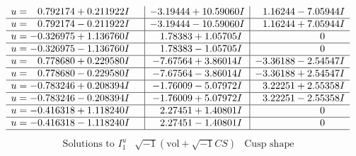 \documentclass[1p]{elsarticle_modified}
\theoremstyle{definition}
\newcommand{\I}{\sqrt{-1}}
\begin{document}
$$\begin{array}{c|c|c}
\begin{aligned}
u &= \phantom{-}0.792174 + 0.211922 I\end{aligned}
 & -3.19444 + 10.59060 I & \phantom{-}1.16244 - 7.05944 I \\ \hline\begin{aligned}
u &= \phantom{-}0.792174 - 0.211922 I\end{aligned}
 & -3.19444 - 10.59060 I & \phantom{-}1.16244 + 7.05944 I \\ \hline\begin{aligned}
u &= -0.326975 + 1.136760 I\end{aligned}
 & \phantom{-}1.78383 + 1.05705 I & \phantom{-0.000000 } 0 \\ \hline\begin{aligned}
u &= -0.326975 - 1.136760 I\end{aligned}
 & \phantom{-}1.78383 - 1.05705 I & \phantom{-0.000000 } 0 \\ \hline\begin{aligned}
u &= \phantom{-}0.778680 + 0.229580 I\end{aligned}
 & -7.67564 + 3.86014 I & -3.36188 - 2.54547 I \\ \hline\begin{aligned}
u &= \phantom{-}0.778680 - 0.229580 I\end{aligned}
 & -7.67564 - 3.86014 I & -3.36188 + 2.54547 I \\ \hline\begin{aligned}
u &= -0.783246 + 0.208394 I\end{aligned}
 & -1.76009 - 5.07972 I & \phantom{-}3.22251 + 2.55358 I \\ \hline\begin{aligned}
u &= -0.783246 - 0.208394 I\end{aligned}
 & -1.76009 + 5.07972 I & \phantom{-}3.22251 - 2.55358 I \\ \hline\begin{aligned}
u &= -0.416318 + 1.118240 I\end{aligned}
 & \phantom{-}2.27451 + 1.40801 I & \phantom{-0.000000 } 0 \\ \hline\begin{aligned}
u &= -0.416318 - 1.118240 I\end{aligned}
 & \phantom{-}2.27451 - 1.40801 I & \phantom{-0.000000 } 0\\
 \hline 
 \end{array}$$\newpage$$\begin{array}{c|c|c}  
\text{Solutions to }I^u_{1}& \I (\text{vol} + \sqrt{-1}CS) & \text{Cusp shape}\\

\end{array}$$
\end{document}
